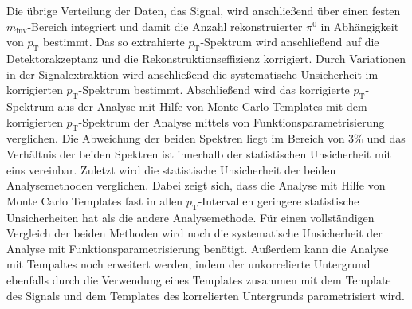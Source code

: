 Die übrige Verteilung der Daten, das Signal, wird anschließend über einen festen $m_\text{inv}$-Bereich integriert und damit die Anzahl rekonstruierter $\pi^{0}$ in Abhängigkeit von $p_\text{T}$ bestimmt.
\newline
Das so extrahierte $p_\text{T}$-Spektrum wird anschließend auf die Detektorakzeptanz und die Rekonstruktionseffizienz korrigiert.
Durch Variationen in der Signalextraktion wird anschließend die systematische Unsicherheit im korrigierten $p_\text{T}$-Spektrum bestimmt.
\newline
Abschließend wird das korrigierte $p_\text{T}$-Spektrum aus der Analyse mit Hilfe von Monte Carlo Templates mit dem korrigierten $p_\text{T}$-Spektrum der Analyse mittels von Funk\-ti\-ons\-pa\-ra\-me\-tri\-sie\-rung verglichen.
Die Abweichung der beiden Spektren liegt im Bereich von $3\%$ und das Verhältnis der beiden Spektren ist innerhalb der statistischen Unsicherheit mit eins vereinbar.
Zuletzt wird die statistische Unsicherheit der beiden Analysemethoden verglichen.
Dabei zeigt sich, dass die Analyse mit Hilfe von Monte Carlo Templates fast in allen $p_\text{T}$-Intervallen geringere statistische Unsicherheiten hat als die andere Analysemethode.
\newline
Für einen vollständigen Vergleich der beiden Methoden wird noch die systematische Unsicherheit der Analyse mit Funktionsparametrisierung benötigt.
Außerdem kann die Analyse mit Tempaltes noch erweitert werden, indem der unkorrelierte Untergrund ebenfalls durch die Verwendung eines Templates zusammen mit dem Template des Signals und dem Templates des korrelierten Untergrunds parametrisiert wird.